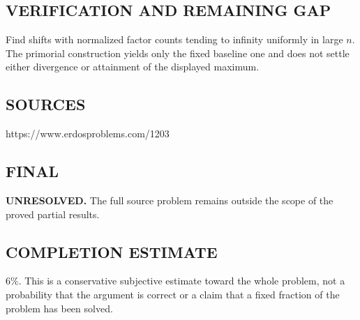 \subsection*{VERIFICATION AND REMAINING GAP}
Find shifts with normalized factor counts tending to infinity uniformly in
large $n$. The primorial construction yields only the fixed baseline one and
does not settle either divergence or attainment of the displayed maximum.

\subsection*{SOURCES}
https://www.erdosproblems.com/1203

\subsection*{FINAL}
\textbf{UNRESOLVED.} The full source problem remains outside the scope of the proved partial results.

\subsection*{COMPLETION ESTIMATE}
$6\%$. This is a conservative subjective estimate toward the whole problem, not a probability that the argument is correct or a claim that a fixed fraction of the problem has been solved.
